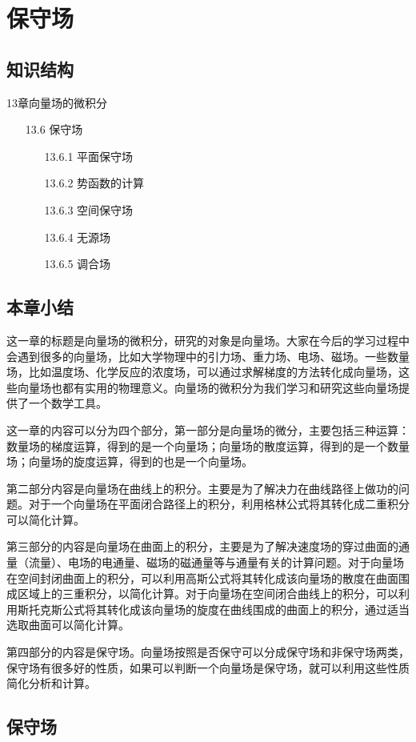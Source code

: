 \documentclass[12pt,UTF8]{ctexart}
\begin{document}
\setcounter{section}{24}
\section{保守场}
\subsection{知识结构}
13章向量场的微积分
	\begin{enumerate}
		\item[13.6]保守场
			\begin{enumerate}
				\item[13.6.1]平面保守场
				\item[13.6.2]势函数的计算
				\item[13.6.3]空间保守场
				\item[13.6.4]无源场
				\item[13.6.5]调合场
			\end{enumerate}
	\end{enumerate}
\subsection{本章小结}
这一章的标题是向量场的微积分，研究的对象是向量场。大家在今后的学习过程中会遇到很多的向量场，比如大学物理中的引力场、重力场、电场、磁场。一些数量场，比如温度场、化学反应的浓度场，可以通过求解梯度的方法转化成向量场，这些向量场也都有实用的物理意义。向量场的微积分为我们学习和研究这些向量场提供了一个数学工具。

这一章的内容可以分为四个部分，第一部分是向量场的微分，主要包括三种运算：数量场的梯度运算，得到的是一个向量场；向量场的散度运算，得到的是一个数量场；向量场的旋度运算，得到的也是一个向量场。

第二部分内容是向量场在曲线上的积分。主要是为了解决力在曲线路径上做功的问题。对于一个向量场在平面闭合路径上的积分，利用格林公式将其转化成二重积分可以简化计算。

第三部分的内容是向量场在曲面上的积分，主要是为了解决速度场的穿过曲面的通量（流量）、电场的电通量、磁场的磁通量等与通量有关的计算问题。对于向量场在空间封闭曲面上的积分，可以利用高斯公式将其转化成该向量场的散度在曲面围成区域上的三重积分，以简化计算。对于向量场在空间闭合曲线上的积分，可以利用斯托克斯公式将其转化成该向量场的旋度在曲线围成的曲面上的积分，通过适当选取曲面可以简化计算。

第四部分的内容是保守场。向量场按照是否保守可以分成保守场和非保守场两类，保守场有很多好的性质，如果可以判断一个向量场是保守场，就可以利用这些性质简化分析和计算。
\subsection{保守场}
\end{document}

